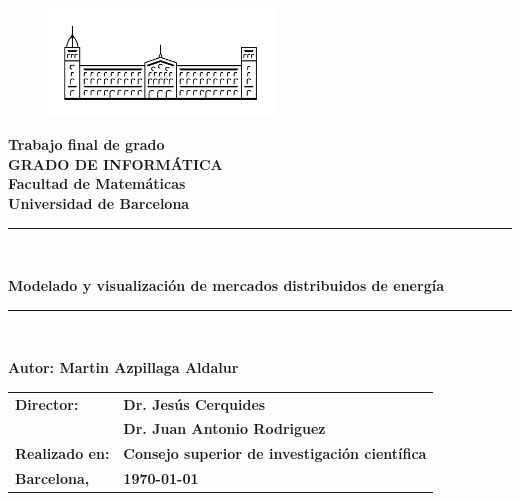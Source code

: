 \documentclass[12pt,a4paper,openright,oneside]{article}
\numberwithin{equation}{section}
\theoremstyle{definition}
\begin{document}

\thispagestyle{empty}

\begin{titlepage}
\begin{center}
\begin{figure}[htb]
\begin{center}
\includegraphics[width=6cm]{ub.png}
\end{center}
\end{figure}

\textbf{\LARGE Trabajo final de grado} \\
\vspace*{.5cm}
\textbf{\LARGE GRADO DE INFORMÁTICA } \\
\vspace*{.5cm}
\textbf{\LARGE Facultad de Matemáticas \\ Universidad de Barcelona} \\
\vspace*{1.5cm}
\rule{16cm}{0.1mm}\\
\begin{Huge}
\textbf{Modelado y visualización de mercados distribuidos de energía} \\
\end{Huge}
\rule{16cm}{0.1mm}\\

\vspace{1cm}

\begin{flushright}
\textbf{\LARGE Autor: Martin Azpillaga Aldalur}

\vspace*{2cm}

\renewcommand{\arraystretch}{1.5}
\begin{tabular}{ll}
\textbf{\Large Director:} & \textbf{\Large Dr. Jesús Cerquides } \\
& \textbf{\Large Dr. Juan Antonio Rodriguez}\\
\textbf{\Large Realizado en:} & \textbf{\Large Consejo superior de investigación científica}\\
\textbf{\Large Barcelona,} & \textbf{\Large \today }
\end{tabular}

\end{flushright}

\end{center}

\end{titlepage}
\end{document}
